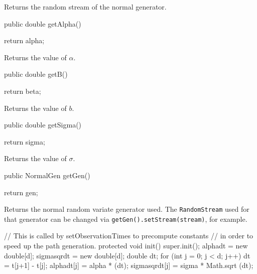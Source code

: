 \begin{tabb}
Returns the random stream of the normal generator.
\end{tabb}
\begin{code}

   public double getAlpha() \begin{hide} { return alpha; }\end{hide}
\end{code}
\begin{tabb}
Returns the value of $\alpha$.
\end{tabb}
\begin{code}

   public double getB() \begin{hide} { return beta; }\end{hide}
\end{code}
\begin{tabb}
Returns the value of $b$.
\end{tabb}
\begin{code}

   public double getSigma() \begin{hide} { return sigma; }\end{hide}
\end{code}
\begin{tabb}
Returns the value of $\sigma$.
\end{tabb}
\begin{code}

   public NormalGen getGen() \begin{hide} { return gen; }\end{hide}
\end{code}
\begin{tabb}
Returns the normal random variate generator used.
The \texttt{RandomStream} used for that generator can be changed via
\texttt{getGen().setStream(stream)}, for example.
\end{tabb}
\begin{code} \begin{hide}

    // This is called by setObservationTimes to precompute constants
    // in order to speed up the path generation.
    protected void init() {
       super.init();
       alphadt = new double[d];
       sigmasqrdt = new double[d];
       double dt;
       for (int j = 0; j < d; j++) {
           dt = t[j+1] - t[j];
           alphadt[j]      = alpha * (dt);
           sigmasqrdt[j]   = sigma * Math.sqrt (dt);
       }
    }\end{hide}
\end{code}
\begin{code}\begin{hide}
} \end{hide}
\end{code}
